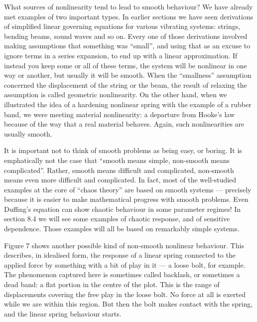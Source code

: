   What sources of nonlinearity tend to lead to smooth behaviour? We have 
  already met examples of two important types. In earlier sections we have seen 
  derivations of simplified linear governing equations for various vibrating 
  systems: strings, bending beams, sound waves and so on. Every one of those 
  derivations involved making assumptions that something was “small”, and using 
  that as an excuse to ignore terms in a series expansion, to end up with a 
  linear approximation. If instead you keep some or all of these terms, the 
  system will be nonlinear in one way or another, but usually it will be 
  smooth. When the ``smallness'' assumption concerned the displacement of the 
  string or the beam, the result of relaxing the assumption is called geometric 
  nonlinearity. On the other hand, when we illustrated the idea of a hardening 
  nonlinear spring with the example of a rubber band, we were meeting material 
  nonlinearity: a departure from Hooke's law because of the way that a real 
  material behaves. Again, such nonlinearities are usually smooth. 

  It is important not to think of smooth problems as being easy, or boring. It 
  is emphatically not the case that ``smooth means simple, non-smooth means 
  complicated''. Rather, smooth means difficult and complicated, non-smooth 
  means even more difficult and complicated. In fact, most of the well-studied 
  examples at the core of ``chaos theory'' are based on smooth systems — 
  precisely because it is easier to make mathematical progress with smooth 
  problems. Even Duffing's equation can show chaotic behaviour in some 
  parameter regimes! In section 8.4 we will see some examples of chaotic 
  response, and of sensitive dependence. Those examples will all be based on 
  remarkably simple systems. 

  Figure 7 shows another possible kind of non-smooth nonlinear behaviour. This 
  describes, in idealised form, the response of a linear spring connected to 
  the applied force by something with a bit of play in it — a loose bolt, for 
  example. The phenomenon captured here is sometimes called backlash, or 
  sometimes a dead band: a flat portion in the centre of the plot. This is the 
  range of displacements covering the free play in the loose bolt. No force at 
  all is exerted while we are within this region. But then the bolt makes 
  contact with the spring, and the linear spring behaviour starts. 


